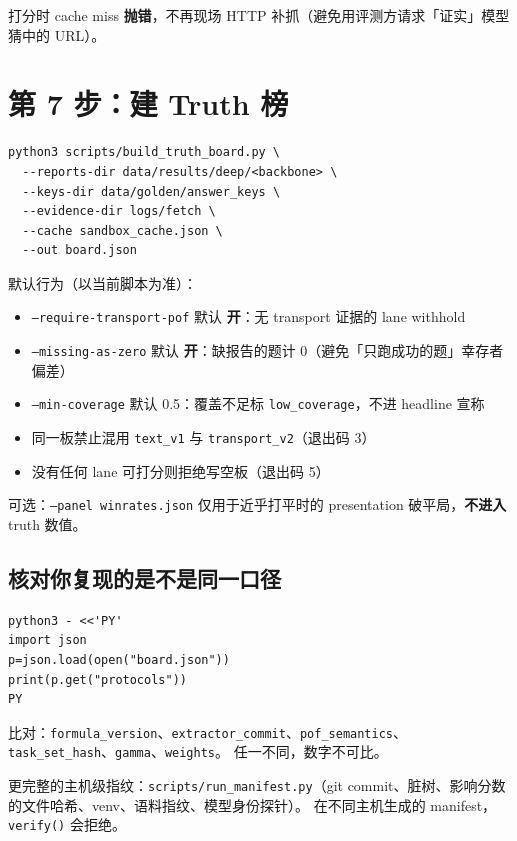 \documentclass[10.5pt,a4paper]{article}
\begin{document}
打分时 cache miss \textbf{抛错}，不再现场 HTTP 补抓（避免用评测方请求「证实」模型猜中的 URL）。

\section{第 7 步：建 Truth 榜}

\begin{lstlisting}
python3 scripts/build_truth_board.py \
  --reports-dir data/results/deep/<backbone> \
  --keys-dir data/golden/answer_keys \
  --evidence-dir logs/fetch \
  --cache sandbox_cache.json \
  --out board.json
\end{lstlisting}

默认行为（以当前脚本为准）：
\begin{itemize}
  \item \texttt{--require-transport-pof} 默认 \textbf{开}：无 transport 证据的 lane withhold
  \item \texttt{--missing-as-zero} 默认 \textbf{开}：缺报告的题计 0（避免「只跑成功的题」幸存者偏差）
  \item \texttt{--min-coverage} 默认 0.5：覆盖不足标 \texttt{low\_coverage}，不进 headline 宣称
  \item 同一板禁止混用 \texttt{text\_v1} 与 \texttt{transport\_v2}（退出码 3）
  \item 没有任何 lane 可打分则拒绝写空板（退出码 5）
\end{itemize}

可选：\texttt{--panel winrates.json} 仅用于近乎打平时的 presentation 破平局，\textbf{不进入} truth 数值。

\subsection{核对你复现的是不是同一口径}

\begin{lstlisting}
python3 - <<'PY'
import json
p=json.load(open("board.json"))
print(p.get("protocols"))
PY
\end{lstlisting}

比对：\texttt{formula\_version}、\texttt{extractor\_commit}、\texttt{pof\_semantics}、\texttt{task\_set\_hash}、\texttt{gamma}、\texttt{weights}。
任一不同，数字不可比。

更完整的主机级指纹：\texttt{scripts/run\_manifest.py}（git commit、脏树、影响分数的文件哈希、venv、语料指纹、模型身份探针）。
在不同主机生成的 manifest，\texttt{verify()} 会拒绝。
\end{document}

